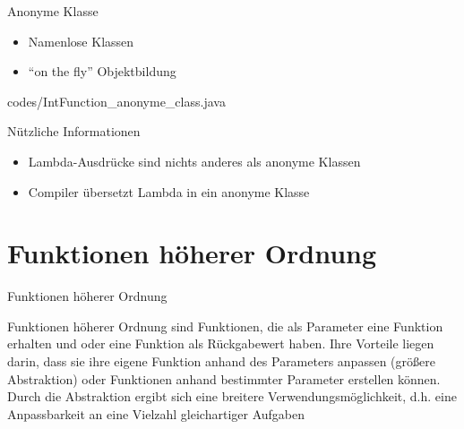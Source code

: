 \documentclass{../tuda-beamer}
\begin{document}
  \begin{frame}{Anonyme Klasse}
    \begin{itemize}
      \item Namenlose Klassen
      \item \enquote{on the fly} Objektbildung
    \end{itemize}

    
    {codes/IntFunction_anonyme_class.java}
  \end{frame}

  \begin{frame}{Nützliche Informationen}
    \begin{itemize}
      \item Lambda-Ausdrücke sind nichts anderes als anonyme Klassen
      \item Compiler übersetzt Lambda in ein anonyme Klasse
    \end{itemize}

    
  \end{frame}


  \section{Funktionen höherer Ordnung}
  \begin{frame}[c]{Funktionen höherer Ordnung}
    \begin{note}[title=Information:]
      Funktionen höherer Ordnung sind Funktionen, die als Parameter eine Funktion erhalten und oder
      eine Funktion als Rückgabewert haben. Ihre Vorteile liegen darin, dass sie ihre eigene Funktion
      anhand des Parameters anpassen (größere Abstraktion) oder Funktionen anhand bestimmter
      Parameter erstellen können. Durch die Abstraktion ergibt sich eine breitere
      Verwendungsmöglichkeit, d.h. eine Anpassbarkeit an eine Vielzahl gleichartiger Aufgaben
    \end{note}
  \end{frame}
\end{document}
